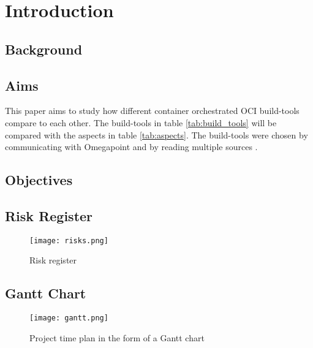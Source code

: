 \chapter{Introduction}
\section{Background}








\section{Aims}
This paper aims to study how different container orchestrated OCI build-tools compare to each other. The build-tools in table \ref{tab:build_tools} will be compared with the aspects in table \ref{tab:aspects}. The build-tools were chosen by communicating with Omegapoint and by reading multiple sources \cite{build_compare} \cite{jib}.

\section{Objectives}

\section{Risk Register}
\begin{sidewaysfigure}[h!]
    \centering
    \texttt{[image: risks.png]}
    \caption{Risk register}
    \label{fig:risk_register}
\end{sidewaysfigure}

\section{Gantt Chart}
\begin{sidewaysfigure}[h!]
    \centering
    \texttt{[image: gantt.png]}
    \caption{Project time plan in the form of a Gantt chart}
    \label{fig:gantt}
\end{sidewaysfigure}

